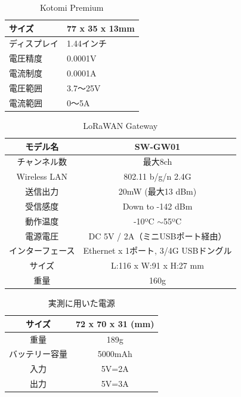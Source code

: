 \begin{table}[]
    \caption{Kotomi Premium}\label{fig:Kotomi_Spec}
    \centering
    \begin{tabular}{|l|l|}
    \hline
    サイズ    & 77 x 35 x 13mm \\ \hline
    ディスプレイ & 1.44インチ        \\ \hline
    電圧精度   & 0.0001V        \\ \hline
    電流制度   & 0.0001A        \\ \hline
    電圧範囲   & 3.7～25V        \\ \hline
    電流範囲   & 0～5A           \\ \hline
    \end{tabular}
\end{table}

\begin{table}[]
    \caption{LoRaWAN Gateway}\label{fig:LoRaWAN_Gateway_Spec}
    \centering
    \begin{tabular}{|c|c|}
    \hline
    モデル名         & SW-GW01                       \\ \hline
    チャンネル数       & 最大8ch                         \\ \hline
    Wireless LAN & 802.11 b/g/n 2.4G             \\ \hline
    送信出力         & 20mW (最大13 dBm)               \\ \hline
    受信感度         & Down to -142 dBm              \\ \hline
    動作温度         & -10ºC $\sim$55ºC              \\ \hline
    電源電圧         & DC 5V / 2A（ミニUSBポート経由）        \\ \hline
    インターフェース     & Ethernet x 1ポート, 3/4G USBドングル \\ \hline
    サイズ          & L:116 x W:91 x H:27 mm        \\ \hline
    重量           & 160g                          \\ \hline
    \end{tabular}
\end{table}

\begin{table}[]
    \caption{実測に用いた電源}\label{fig:LoRaWAN_Battery}
    \centering
    \begin{tabular}{|c|c|}
    \hline
    サイズ     & 72 x 70 x 31 (mm) \\ \hline
    重量      & 189g              \\ \hline
    バッテリー容量 & 5000mAh           \\ \hline
    入力      & 5V=2A             \\ \hline
    出力      & 5V=3A             \\ \hline
    \end{tabular}
\end{table}

